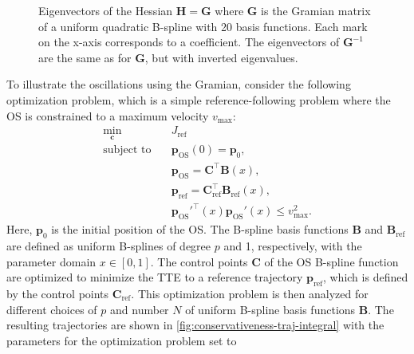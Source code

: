 \begin{figure}
    \centering
    
    \caption{Eigenvectors of the Hessian $\mathbf H = \mathbf G$ where $\mathbf G$ is the Gramian matrix of a uniform quadratic B-spline with 20 basis functions. Each mark on the x-axis corresponds to a coefficient. The eigenvectors of $\mathbf G^{-1}$ are the same as for $\mathbf G$, but with inverted eigenvalues.}
    \label{fig:integral-basis-eigenvectors-20}
\end{figure}



To illustrate the oscillations using the Gramian, consider the following optimization problem, which is a simple reference-following problem where the OS is constrained to a maximum velocity $v_\text{max}$:
\begin{equation}\label{eq:conservativeness-optimization}
    \begin{aligned}
        \min_{\mathbf c} \quad & J_\text{ref} \\
        \text{subject to} \quad &\mathbf p_\text{OS}(0) = \mathbf p_0, \\
                    &\mathbf p_\text{OS} = \mathbf C^\top\mathbf B(x) , \\
                    &\mathbf p_\text{ref} = \mathbf C_\text{ref}^\top\mathbf B_\text{ref}(x) , \\
                    & \mathbf p_\text{OS}'^\top(x) \mathbf p_\text{OS}'(x) \le v_\text{max}^2.
    \end{aligned}
\end{equation}
Here, $\mathbf p_0$ is the initial position of the OS. The B-spline basis functions $\mathbf B$ and $\mathbf B_\text{ref}$ are defined as uniform B-splines of degree $p$ and 1, respectively, with the parameter domain $x\in[0,1]$. The control points $\mathbf C$ of the OS B-spline function are optimized to minimize the TTE to a reference trajectory $\mathbf p_\text{ref}$, which is defined by the control points $\mathbf C_\text{ref}$.
This optimization problem is then analyzed for different choices of $p$ and number $N$ of uniform B-spline basis functions $\mathbf B$. The resulting trajectories are shown in \cref{fig:conservativeness-traj-integral} with the parameters for the optimization problem set to
